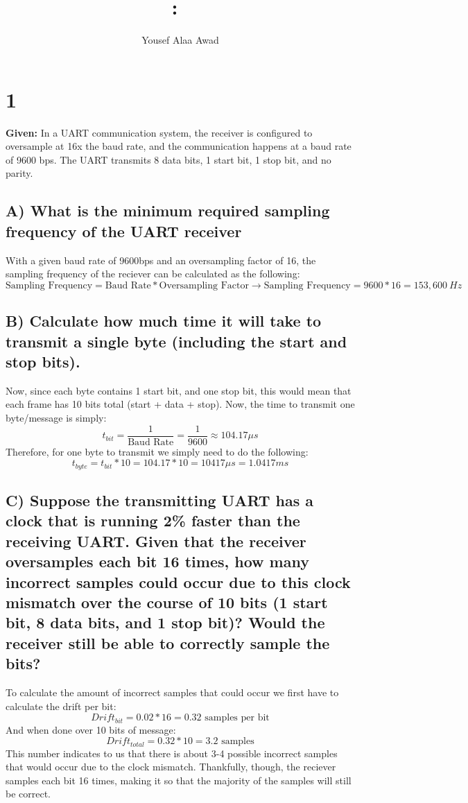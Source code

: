 \documentclass{article}
\title{
    \vspace{2in}
    \textmd{\textbf{\hmwkClass:\ \hmwkTitle}}\\
    \normalsize\vspace{0.1in}
    \vspace{3in}
}
\author{Yousef Alaa Awad}
\begin{document}
\maketitle
\pagebreak

\section{1}
\textbf{Given:} In a UART communication system, the receiver is configured to oversample at 16x the baud rate, and the communication happens at a baud rate of 9600 bps. The UART transmits 8 data bits, 1 start bit, 1 stop bit, and no parity.

\subsection{A) What is the minimum required sampling frequency of the UART receiver}
With a given baud rate of 9600bps and an oversampling factor of 16, the sampling frequency of the reciever can be calculated as the following:
$$ \text{Sampling Frequency} = \text{Baud Rate} * \text{Oversampling Factor} \rightarrow \text{Sampling Frequency} = 9600*16 = 153,600\ Hz $$

\subsection{B) Calculate how much time it will take to transmit a single byte (including the start and stop bits).}
Now, since each byte contains 1 start bit, and one stop bit, this would mean that each frame has 10 bits total (start + data + stop). Now, the time to transmit one byte/message is simply:
$$ t_{bit} = \frac{1}{\text{Baud Rate}} = \frac{1}{9600} \approx 104.17\mu s$$
Therefore, for one byte to transmit we simply need to do the following:
$$ t_{byte} = t_{bit}*10 = 104.17*10 = 10417\mu s = 1.0417ms $$

\subsection{C) Suppose the transmitting UART has a clock that is running 2\% faster than the receiving UART. Given that the receiver oversamples each bit 16 times, how many incorrect samples could occur due to this clock mismatch over the course of 10 bits (1 start bit, 8 data bits, and 1 stop bit)? Would the receiver still be able to correctly sample the bits?}
To calculate the amount of incorrect samples that could occur we first have to calculate the drift per bit:
$$ Drift_{bit} = 0.02*16 = 0.32 \text{ samples per bit} $$
And when done over 10 bits of message:
$$ Drift_{total} = 0.32 * 10 = 3.2 \text{ samples} $$
This number indicates to us that there is about 3-4 possible incorrect samples that would occur due to the clock mismatch. Thankfully, though, the reciever samples each bit 16 times, making it so that the majority of the samples will still be correct.
\end{document}
